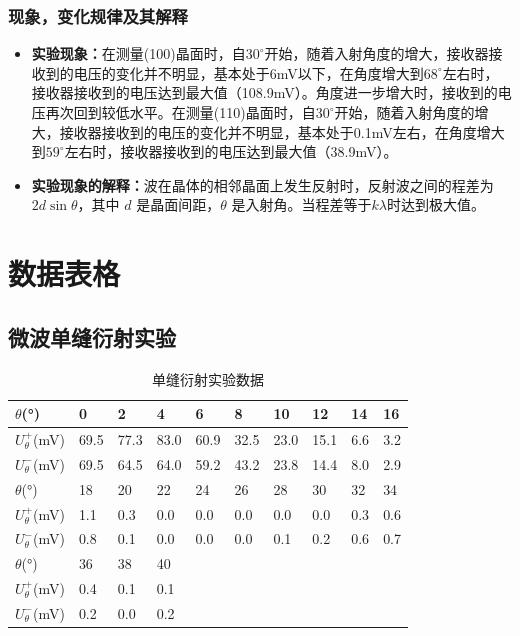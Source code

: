 \documentclass[zihao=5, UTF8]{article}
\theoremstyle{MyLineTheoremStyle} %
\theoremstyle{MyBlockTheoremStyle} %
\theoremstyle{MySubsubsectionStyle} %
\begin{document}
\subsubsection{现象，变化规律及其解释}
\begin{itemize}
  \item \textbf{实验现象：}在测量(100)晶面时，自$30^\circ$开始，随着入射角度的增大，接收器接收到的电压的变化并不明显，基本处于6mV以下，在角度增大到$68^\circ$左右时，接收器接收到的电压达到最大值（108.9mV）。角度进一步增大时，接收到的电压再次回到较低水平。在测量(110)晶面时，自$30^\circ$开始，随着入射角度的增大，接收器接收到的电压的变化并不明显，基本处于0.1mV左右，在角度增大到$59^\circ$左右时，接收器接收到的电压达到最大值（38.9mV）。
  \item \textbf{实验现象的解释：}波在晶体的相邻晶面上发生反射时，反射波之间的程差为 $2d\sin\theta$，其中 $d$ 是晶面间距，$\theta$ 是入射角。当程差等于$k\lambda$时达到极大值。
\end{itemize}

\section{数据表格}
\subsection{微波单缝衍射实验}
\begin{table}[H]
    \centering
    \begin{tabularx}{\textwidth}{|X|*{9}{X|}} %
        \hline
        \(\theta\)(°)     & 0  & 2  & 4  & 6  & 8  & 10 & 12 & 14 & 16 \\ %
        \hline
        \(U_\theta^+\)(mV) & 69.5 & 77.3 & 83.0 & 60.9 & 32.5 & 23.0 & 15.1 & 6.6 & 3.2 \\ %
        \hline
        \(U_\theta^-\)(mV) & 69.5 & 64.5 & 64.0 & 59.2 & 43.2 & 23.8 & 14.4 & 8.0 & 2.9 \\ %
        \hline
        \(\theta\)(°)     & 18  & 20  & 22  & 24  & 26  & 28  & 30  & 32  & 34 \\ %
        \hline
        \(U_\theta^+\)(mV) & 1.1  & 0.3  & 0.0  & 0.0  & 0.0  & 0.0  & 0.0  & 0.3  & 0.6 \\ %
        \hline
        \(U_\theta^-\)(mV) & 0.8  & 0.1  & 0.0  & 0.0  & 0.0  & 0.1  & 0.2  & 0.6  & 0.7 \\ %
        \hline
        \(\theta\)(°)     & 36  & 38  & 40  &   &   &   &   &   &   \\ %
        \hline
        \(U_\theta^+\)(mV) & 0.4  & 0.1  & 0.1  &   &   &   &   &   &   \\ %
        \hline
        \(U_\theta^-\)(mV) & 0.2  & 0.0  & 0.2  &   &   &   &   &   &   \\ %
        \hline
    \end{tabularx}
    \caption{单缝衍射实验数据}
    \label{单缝衍射实验数据表}
\end{table}
\end{document}
